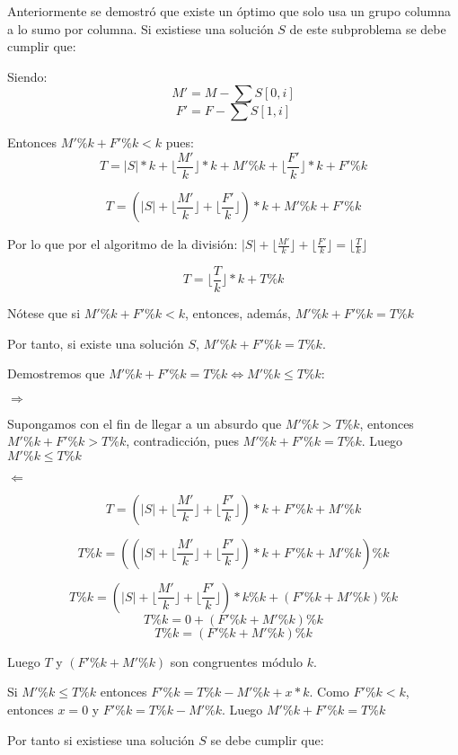 \documentclass[article]{llncs}
\begin{document}
Anteriormente se demostr\'o que existe un \'optimo que solo usa un grupo columna a lo sumo 
por columna. Si existiese una solución $S$ de este subproblema se debe cumplir que:


Siendo:
$$M' = M - \sum S[0,i]$$
$$F' = F - \sum S[1, i]$$

Entonces $M' \% k + F' \% k < k$ pues: 
$$T = |S| * k + \lfloor\frac{M'}{k}\rfloor*k + M'\%k + \lfloor\frac{F'}{k}\rfloor*k + F' \% k$$

$$T = (|S| + \lfloor\frac{M'}{k}\rfloor + \lfloor\frac{F'}{k}\rfloor)*k + M'\%k + F'\%k$$

Por lo que por el algoritmo de la división: $|S| + \lfloor\frac{M'}{k}\rfloor + \lfloor\frac{F'}{k}\rfloor = \lfloor\frac{T}{k}\rfloor$

$$T = \lfloor\frac{T}{k}\rfloor*k + T \% k$$

Nótese que si $M' \% k + F' \% k < k$, entonces, además, $M' \% k + F' \% k = T \% k$

Por tanto, si existe una solución $S$, $M' \% k + F' \% k = T \% k$.

Demostremos que $M' \% k + F' \% k = T \% k \Leftrightarrow M' \% k \leq T \% k$:

$\Rightarrow$

Supongamos con el fin de llegar a un absurdo que $M' \% k > T\%k$,
entonces $M'\%k + F'\%k > T\%k$, contradicci\'on, pues 
$M' \% k + F' \% k = T \% k$. Luego $M' \% k \leq T \% k$

$\Leftarrow$

$$T = (|S| + \lfloor\frac{M'}{k}\rfloor + \lfloor\frac{F'}{k}\rfloor)*k + F'\%k + M'\% k$$

$$T\%k = ((|S| + \lfloor\frac{M'}{k}\rfloor + \lfloor\frac{F'}{k}\rfloor)*k + F'\%k + M'\% k)\%k$$

$$T\%k = (|S| + \lfloor\frac{M'}{k}\rfloor + \lfloor\frac{F'}{k}\rfloor)*k\%k + (F'\%k + M'\% k)\%k$$
$$T\%k = 0 + (F'\%k + M'\% k)\%k$$
$$T\%k = (F'\%k + M'\% k)\%k$$

Luego $T$ y $(F'\%k + M'\% k)$ son congruentes m\'odulo $k$.

Si $M' \% k \leq T \% k$ entonces $F' \%k = T\%k - M'\%k + x*k$.
Como $F' \% k < k$, entonces $x = 0$ y $F' \% k = T\%k - M'\%k$. Luego 
$M' \%k + F' \% k  = T \% k$

Por tanto si existiese una solución $S$ se debe cumplir que:
\end{document}
